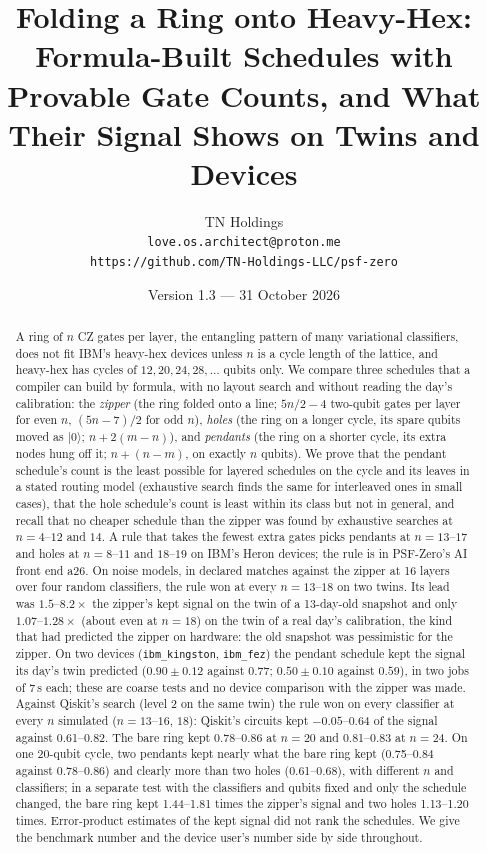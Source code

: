 \documentclass[11pt]{article}
\title{Folding a Ring onto Heavy-Hex:\\
Formula-Built Schedules with Provable Gate Counts, and What Their Signal Shows on Twins and Devices}
\author{TN Holdings\\
\texttt{love.os.architect@proton.me}\\
\texttt{https://github.com/TN-Holdings-LLC/psf-zero}}
\date{Version 1.3 --- 31 October 2026}
\begin{document}
\maketitle

\begin{abstract}
A ring of $n$ CZ gates per layer, the entangling pattern of many variational classifiers, does not fit IBM's
heavy-hex devices unless $n$ is a cycle length of the lattice, and heavy-hex has cycles of $12, 20, 24, 28, \dots$
qubits only. We compare three schedules that a compiler can build by formula, with no layout search and without
reading the day's calibration: the \emph{zipper} (the ring folded onto a line; $5n/2-4$ two-qubit gates per layer for
even $n$, $(5n-7)/2$ for odd $n$), \emph{holes} (the ring on a longer cycle, its spare qubits moved as $|0\rangle$;
$n + 2(m-n)$), and \emph{pendants} (the ring on a shorter cycle, its extra nodes hung off it; $n + (n-m)$, on exactly
$n$ qubits). We prove that the pendant schedule's count is the least possible for layered schedules on the cycle and its leaves in a stated routing
model (exhaustive search finds the same for interleaved ones in small cases), that the hole schedule's count is least
within its class but not in general, and recall that no cheaper schedule than the zipper
was found by exhaustive searches at $n = 4$--$12$ and $14$. A rule that takes the fewest extra gates picks pendants at $n = 13$--$17$
and holes at $n = 8$--$11$ and $18$--$19$ on IBM's Heron devices; the rule is in PSF-Zero's AI front end a26. On noise
models, in declared matches against the zipper at 16 layers over four random classifiers, the rule won at every
$n = 13$--$18$ on two twins. Its lead was $1.5$--$8.2\times$ the zipper's kept signal on the twin of a 13-day-old
snapshot and only $1.07$--$1.28\times$ (about even at $n = 18$) on the twin of a real day's calibration, the kind that
had predicted the zipper on hardware: the old snapshot was pessimistic for the zipper. On two devices
(\texttt{ibm\_kingston}, \texttt{ibm\_fez}) the pendant schedule kept the signal its day's twin predicted
($0.90 \pm 0.12$ against $0.77$; $0.50 \pm 0.10$ against $0.59$), in two jobs of 7\,s each; these are coarse tests and
no device comparison with the zipper was made. Against Qiskit's search (level 2 on the same twin) the rule won on every
classifier at every $n$ simulated ($n = 13$--$16$, $18$): Qiskit's circuits kept $-0.05$--$0.64$ of the signal against
0.61--0.82. The bare ring kept 0.78--0.86 at $n = 20$ and 0.81--0.83 at $n = 24$. On one 20-qubit cycle, two pendants kept nearly what
the bare ring kept (0.75--0.84 against 0.78--0.86) and
clearly more than two holes (0.61--0.68), with different $n$ and classifiers; in a separate test with the classifiers and qubits fixed and only the schedule changed, the
bare ring kept 1.44--1.81 times the zipper's signal and two holes 1.13--1.20 times. Error-product estimates of the kept signal did not rank the schedules.
We give the benchmark number and the device user's number side by side throughout.
\end{abstract}
\end{document}
